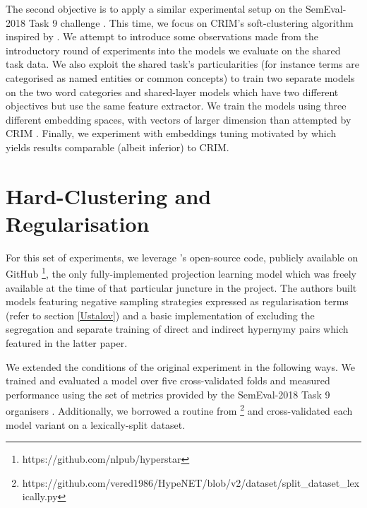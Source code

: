 The second objective is to apply a similar experimental setup on the SemEval-2018 Task 9 challenge \citep{camacho2018semeval}.  This time, we focus on CRIM's soft-clustering algorithm \citep{bernier2018crim} inspired by \citep{yamane2016distributional}.  We attempt to introduce some observations made from the introductory round of experiments into the models we evaluate on the shared task data.  We also exploit the shared task's particularities (for instance terms are categorised as named entities or common concepts) to train two separate models on the two word categories and shared-layer models which have two different objectives but use the same feature extractor.  We train the models using three different embedding spaces, with vectors of larger dimension than attempted by CRIM \citep{bernier2018crim}.  Finally, we experiment with embeddings tuning motivated by \citep{howard2018universal} which yields results comparable (albeit inferior) to CRIM.  


\section{Hard-Clustering and Regularisation}
For this set of experiments, we leverage \citeauthor{ustalov2017negative}'s open-source code, publicly available on GitHub \footnote{https://github.com/nlpub/hyperstar}, the only fully-implemented projection learning model which was freely available at the time of that particular juncture in the project.  The authors built models featuring  negative sampling strategies expressed as regularisation terms (refer to section \ref{Ustalov}) and a basic implementation of \citep{Fu2014} excluding the segregation and separate training of direct and indirect hypernymy pairs which featured in the latter paper.

We extended the conditions of the original experiment in the following ways.  We trained and evaluated a model over five cross-validated folds and measured performance using the set of metrics provided by the SemEval-2018 Task 9 organisers \citep{camacho2018semeval}.  Additionally, we borrowed a routine from \citep{shwartz2016path} \footnote{https://github.com/vered1986/HypeNET/blob/v2/dataset/split\_dataset\_lexically.py} and cross-validated each model variant on a lexically-split dataset.  

